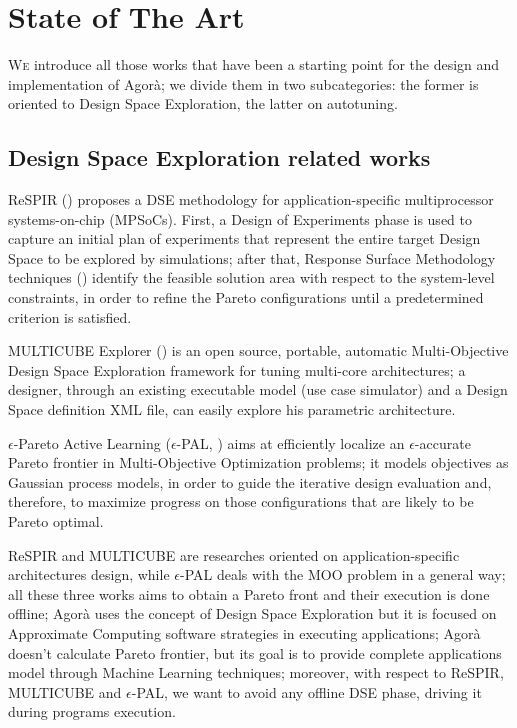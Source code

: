 \chapter{State of The Art}\label{sota}

\lettrine{W}{e} introduce all those works that have been a starting point for the design and implementation of Agorà; we divide them in two subcategories: the former is oriented to Design Space Exploration, the latter on autotuning.

\section{Design Space Exploration related works}

ReSPIR (\cite{palermo2009respir}) proposes a DSE methodology for application-specific multiprocessor systems-on-chip (MPSoCs). First, a Design of Experiments phase is used to capture an initial plan of experiments that represent the entire target Design Space to be explored by simulations; after that, Response Surface Methodology techniques (\cite{khuri2010response}) identify the feasible solution area with respect to the system-level constraints, in order to refine the Pareto configurations until a predetermined criterion is satisfied.

MULTICUBE Explorer (\cite{silvano2011multicube}) is an open source, portable, automatic Multi-Objective Design Space Exploration framework for tuning multi-core architectures; a designer, through an existing executable model (use case simulator) and a Design Space definition XML file, can easily explore his parametric architecture.

$\epsilon$-Pareto Active Learning ($\epsilon$-PAL, \cite{zuluaga2016e}) aims at efficiently localize an $\epsilon$-accurate Pareto frontier in Multi-Objective Optimization problems; it models objectives as Gaussian process models, in order to guide the iterative design evaluation and, therefore, to maximize progress on those configurations that are likely to be Pareto optimal.

ReSPIR and MULTICUBE are researches oriented on application-specific architectures design, while $\epsilon$-PAL deals with the MOO problem in a general way; all these three works aims to obtain a Pareto front and their execution is done offline; Agorà uses the concept of Design Space Exploration but it is focused on Approximate Computing software strategies in executing applications; Agorà doesn't calculate Pareto frontier, but its goal is to provide complete applications model through Machine Learning techniques; moreover, with respect to ReSPIR, MULTICUBE and $\epsilon$-PAL, we want to avoid any offline DSE phase, driving it during programs execution.

